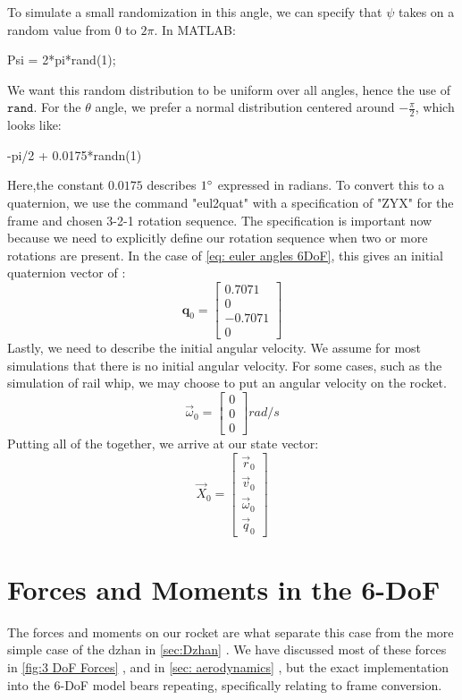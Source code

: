 \documentclass[10pt, openany, titlepage]{book}
\theoremstyle{definition}
\let\oldautoref\autoref
\renewcommand{\autoref}[1]{%
  \begingroup
  \hypersetup{linkcolor=black}%
  \oldautoref{#1}%
  \endgroup
}
\begin{document}
To simulate a small randomization in this angle, we can specify that $\psi$ takes on a random value from $0$ to $2\pi$. In MATLAB:
\begin{matlabscript}{}
Psi = 2*pi*rand(1);
\end{matlabscript}
We want this random distribution to be uniform over all angles, hence the use of $\texttt{rand}$. For the $\theta$ angle, we prefer a normal distribution centered around $-\frac{\pi}{2}$, which looks like:
\begin{matlabscript}{}
-pi/2 + 0.0175*randn(1)
\end{matlabscript}
Here,the constant $0.0175$ describes $1\degree$ expressed in radians. To convert this to a quaternion, we use the command "eul2quat" with a specification of "ZYX" for the frame and chosen 3-2-1 rotation sequence. The specification is important now because we need to explicitly define our rotation sequence when two or more rotations are present. In the case of \eqref{eq: euler angles 6DoF}, this gives an initial \gls{quaternion} vector of :
$$\mathbf{q}_0=\begin{bmatrix}
    0.7071\\0\\-0.7071\\0
\end{bmatrix}$$
Lastly, we need to describe the initial angular velocity. We assume for most simulations that there is no initial angular velocity. For some cases, such as the simulation of \gls{rail whip}, we may choose to put an angular velocity on the rocket.
$$\vec{\omega}_0=\begin{bmatrix}
0\\0\\0
\end{bmatrix} rad/s$$
Putting all of the together, we arrive at our \gls{state vector}:
$$\vec{X}_0=\begin{bmatrix}
    \vec{r}_0\\\vec{v}_0\\\vec{\omega}_0\\\vec{q}_0
\end{bmatrix}$$
\section{Forces and Moments in the 6-DoF}
The forces and moments on our rocket are what separate this case from the more simple case of the \gls{dzhan} in \autoref{sec:Dzhan}. We have discussed most of these forces in \autoref{fig:3 DoF Forces}, and in \autoref{sec: aerodynamics}, but the exact implementation into the 6-DoF model bears repeating, specifically relating to frame conversion.
\end{document}
